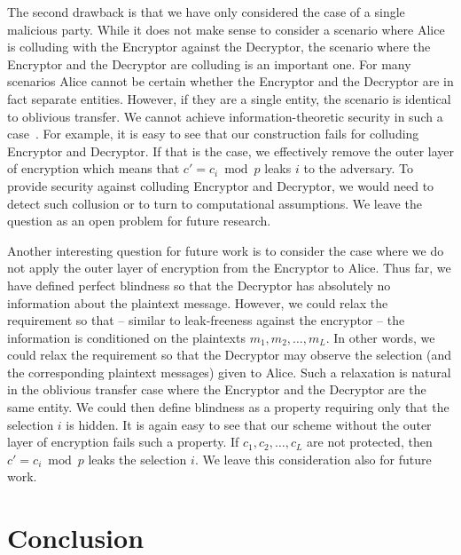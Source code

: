 \documentclass[10pt,journal]{IEEEtran}
\begin{document}
The second drawback is that we have only considered the case of a single malicious party. While it does not make
sense to consider a scenario where Alice is colluding with the Encryptor against the Decryptor,
the scenario where the Encryptor and the Decryptor are colluding is an important one. For many scenarios Alice cannot be certain
whether the Encryptor and the Decryptor are in fact separate entities.
However, if they are a single entity, the scenario is identical to oblivious transfer.
We cannot achieve information-theoretic security in such a case~\cite{Damgard_1999}.
For example,
it is easy to see that our construction fails for colluding Encryptor and Decryptor.
If that is the case, we effectively remove the outer layer of encryption which means
that $c' = c_i \bmod{p}$ leaks $i$ to the adversary.
To provide security against
colluding Encryptor and Decryptor, we would need to detect such collusion or to turn to computational
assumptions. We leave the question as an open problem for future research. 

Another interesting question for future work is to consider the case where we do not apply the outer layer
of encryption from the Encryptor to Alice. Thus far, we have defined perfect blindness so that the Decryptor has absolutely no information about
the plaintext message.
However, we could relax the requirement so that -- similar to leak-freeness against the encryptor --
the information is conditioned on the plaintexts $m_1,m_2,\ldots,m_L$. In other words, we could relax the requirement so
that the Decryptor may observe the selection (and the corresponding plaintext messages) given to Alice.
Such a relaxation
is natural in the oblivious transfer case where the Encryptor and the Decryptor are the same entity.
We could then define blindness as a property
requiring only that the selection $i$ is hidden. It is again easy to see that our scheme without the outer layer
of encryption fails such a property. If $c_1,c_2,\ldots,c_L$ are not protected, then $c' = c_i \bmod{p}$ leaks the selection $i$.
We leave this consideration also for future work.

\section{Conclusion}
\label{sec:Conclusion}
\end{document}
